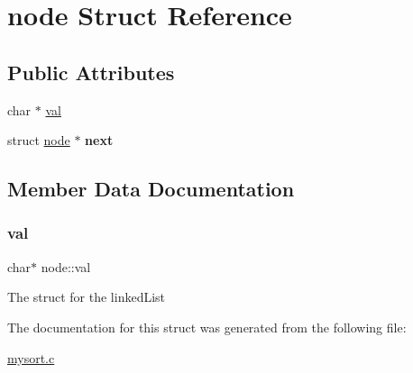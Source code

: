 \hypertarget{structnode}{}\section{node Struct Reference}
\label{structnode}
\subsection*{Public Attributes}
\begin{DoxyCompactItemize}
\item 
char $\ast$ \hyperlink{structnode_a9e2bf347be4cd0a7cca089f90c83acf8}{val}
\item 
\mbox{\label{structnode_aa3e8aa83f864292b5a01210f4453fcc0}} 
struct \hyperlink{structnode}{node} $\ast$ {\bfseries next}
\end{DoxyCompactItemize}


\subsection{Member Data Documentation}
\mbox{\label{structnode_a9e2bf347be4cd0a7cca089f90c83acf8}} 
\subsubsection{\texorpdfstring{val}{val}}
{\footnotesize\ttfamily char$\ast$ node\+::val}

The struct for the linked\+List 

The documentation for this struct was generated from the following file\+:\begin{DoxyCompactItemize}
\item 
\hyperlink{mysort_8c}{mysort.\+c}\end{DoxyCompactItemize}
